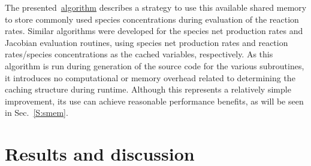 \documentclass[preprint]{elsarticle}
\begin{document}
The presented~\hyperref[A:shared_mem_caching]{algorithm} describes a strategy to use this available shared memory to store commonly used species concentrations during evaluation of the reaction rates.
Similar algorithms were developed for the species net production rates and Jacobian evaluation routines, using species net production rates  and reaction rates\slash species concentrations as the cached variables, respectively.
As this algorithm is run during generation of the source code for the various subroutines, it introduces no computational or memory overhead related to determining the caching structure during runtime.
Although this represents a relatively simple improvement, its use can achieve reasonable performance benefits, as will be seen in Sec.~\ref{S:smem}.

\section{Results and discussion}
\end{document}
